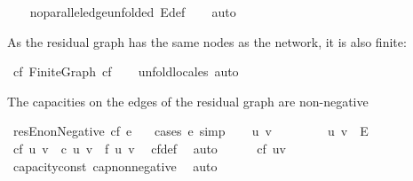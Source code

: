 \begin{isabellebody}
\ \ \isamarkupfalse%
\ no{\isacharunderscore}parallel{\isacharunderscore}edge{\isacharbrackleft}unfolded\ E{\isacharunderscore}def{\isacharbrackright}\isanewline
\ \ \isamarkupfalse%
\ auto%
\endisatagproof
{\isafoldproof}%
%
\isadelimproof
%
\endisadelimproof
%
\begin{isamarkuptext}%
As the residual graph has the same nodes as the network, it is also finite:%
\end{isamarkuptext}\isamarkuptrue%
\isamarkupfalse%
\ cf{\isacharcolon}\ Finite{\isacharunderscore}Graph\ cf\isanewline
%
\isadelimproof
\ \ %
\endisadelimproof
%
\isatagproof
{}\isamarkupfalse%
\ unfold{\isacharunderscore}locales\ auto%
\endisatagproof
{\isafoldproof}%
%
\isadelimproof
%
\endisadelimproof
%
\begin{isamarkuptext}%
The capacities on the edges of the residual graph are non-negative%
\end{isamarkuptext}\isamarkuptrue%
\isamarkupfalse%
\ resE{\isacharunderscore}nonNegative{\isacharcolon}\ {\isachardoublequoteopen}cf\ e\ {\isasymge}\ {}{\isachardoublequoteclose}\isanewline
%
\isadelimproof
%
\endisadelimproof
%
\isatagproof
{}\isamarkupfalse%
\ {\isacharparenleft}cases\ e{\isacharsemicolon}\ simp{\isacharparenright}\isanewline
\ \ \isamarkupfalse%
\ u\ v\isanewline
\ \ \isacommand{{\isacharbraceleft}}\isamarkupfalse%
\isanewline
\ \ \ \ \isamarkupfalse%
\ {\isachardoublequoteopen}{\isacharparenleft}u{\isacharcomma}\ v{\isacharparenright}\ {\isasymin}\ E{\isachardoublequoteclose}\isanewline
\ \ \ \ \isamarkupfalse%
\ \isamarkupfalse%
\ {\isachardoublequoteopen}cf\ {\isacharparenleft}u{\isacharcomma}\ v{\isacharparenright}\ {\isacharequal}\ c\ {\isacharparenleft}u{\isacharcomma}\ v{\isacharparenright}\ {\isacharminus}\ f\ {\isacharparenleft}u{\isacharcomma}\ v{\isacharparenright}{\isachardoublequoteclose}\ \isamarkupfalse%
\ cf{\isacharunderscore}def\ \isamarkupfalse%
\ auto\isanewline
\ \ \ \ \isamarkupfalse%
\ {\isachardoublequoteopen}cf\ {\isacharparenleft}u{\isacharcomma}v{\isacharparenright}\ {\isasymge}\ {}{\isachardoublequoteclose}\ \isanewline
\ \ \ \ \ \ \isamarkupfalse%
\ capacity{\isacharunderscore}const\ cap{\isacharunderscore}non{\isacharunderscore}negative\ \isamarkupfalse%
\ auto\isanewline
\ \ \isacommand{{\isacharbraceright}}\isamarkupfalse%

\end{isabellebody}

